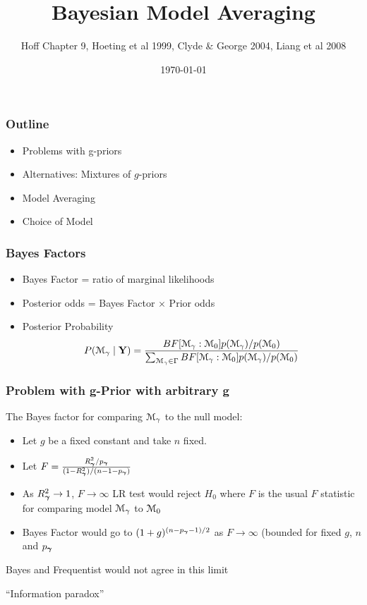 \documentclass{beamer}\usepackage[]{graphicx}\usepackage[]{color}
\title{Bayesian Model Averaging}
\author{Hoff Chapter 9, Hoeting et al 1999, Clyde \& George 2004, Liang et al 2008}
\date{\today}
\begin{document}
\maketitle

\begin{frame} \frametitle{Outline}

\begin{itemize}
\item Problems with g-priors
\item Alternatives:  Mixtures of $g$-priors
\item Model Averaging
\item Choice of Model
\end{itemize}

\end{frame}

\begin{frame}
\frametitle{Bayes Factors}
\begin{itemize}
\item Bayes Factor = ratio of marginal likelihoods \pause

\item Posterior odds = Bayes Factor $\times$ Prior odds \pause

\item Posterior Probability
$$P({\cal M}_\gamma \mid \mathbf{Y}) = \frac{BF[{\cal M}_\gamma : {{\cal M}}_0] p({\cal M}_\gamma)/p({{\cal M}}_0)}
{\sum_{{\cal M}_\gamma \in \Gamma} BF[{\cal M}_\gamma : {{\cal M}}_0] p({\cal M}_\gamma)/p({{\cal M}}_0)}
$$

\end{itemize}
\end{frame}

\begin{frame}  \frametitle{Problem with g-Prior with arbitrary g}

The Bayes factor for comparing ${\cal M}_\gamma$ to the null
model:
\pause
\begin{itemize}
\item Let $g$ be a fixed constant and take $n$ fixed.\pause
\item Let $F = \frac{R_{\boldsymbol{\gamma}}^2/p_{\boldsymbol{\gamma}}}{(1 - R_{\boldsymbol{\gamma}}^2)/(n - 1 - p_{\boldsymbol{\gamma}})}$ \pause
\item As $R^2_{\boldsymbol{\gamma}} \to 1$, $F \to \infty$ LR test would reject $H_0$  where
 $F$ is the usual $F$ statistic for  comparing model ${\cal M}_\gamma$ to ${{\cal M}}_0$ \pause
\item Bayes Factor would go to $(1 + g)^{(n-p_{\boldsymbol{\gamma}} -1)/2}$ as $F \to \infty$  (bounded for fixed $g$, $n$ and $p_{\boldsymbol{\gamma}}$ \pause
\end{itemize}

Bayes and Frequentist would not agree in this limit \pause

\vspace{12pt}
``Information paradox''
\end{frame}
\end{document}
